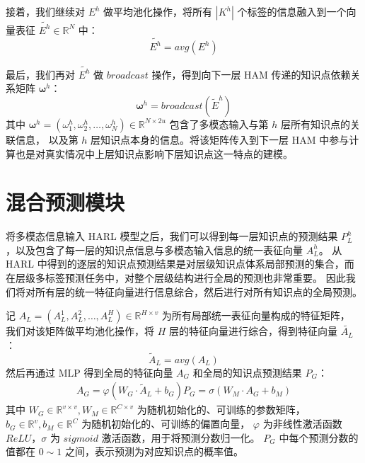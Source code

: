     接着，我们继续对 $E^h$ 做平均池化操作，将所有 $\left|K^h\right|$ 个标签的信息融入到一个向量表征 $\tilde{E^h} \in \mathbb{R}^{N}$ 中：
    \begin{equation}
        \tilde{E^h} = avg(E^h)
    \end{equation}

    最后，我们再对 $\tilde{E^h}$ 做 $broadcast$ 操作，得到向下一层 HAM 传递的知识点依赖关系矩阵 $\boldsymbol{\omega}^h$：
    \begin{equation}
        \boldsymbol{\omega}^h = broadcast(\tilde{E}^h)
    \end{equation}
    其中 $\boldsymbol{\omega}^h = (\omega_1^h, \omega_2^h, \dots, \omega_N^h) \in \mathbb{R}^{N \times 2u}$ 包含了多模态输入与第 $h$ 层所有知识点的关联信息，
    以及第 $h$ 层知识点本身的信息。将该矩阵传入到下一层 HAM 中参与计算也是对真实情况中上层知识点影响下层知识点这一特点的建模。


\section{混合预测模块}
    将多模态信息输入 HARL 模型之后，我们可以得到每一层知识点的预测结果 $P_L^h$，以及包含了每一层的知识点信息与多模态输入信息的统一表征向量 $A_L^h$。
    从 HARL 中得到的逐层的知识点预测结果是对层级知识点体系局部预测的集合，而在层级多标签预测任务中，对整个层级结构进行全局的预测也非常重要。
    因此我们将对所有层的统一特征向量进行信息综合，然后进行对所有知识点的全局预测。

    记 $A_L = (A_L^1, A_L^2, \dots, A_L^H) \in \mathbb{R}^{H \times v}$ 为所有局部统一表征向量构成的特征矩阵，
    我们对该矩阵做平均池化操作，将 $H$ 层的特征向量进行综合，得到特征向量 $\tilde{A_L}$：
    \begin{equation}
        \tilde{A}_L = avg(A_L)
    \end{equation}
    然后再通过 MLP 得到全局的特征向量 $A_G$ 和全局的知识点预测结果 $P_G$：
    \begin{equation}
        \begin{aligned}
            A_G = \varphi\left(W_G \cdot \tilde{A}_L + b_G\right)
            P_G = \sigma\left(W_M \cdot A_G + b_M\right)
        \end{aligned}
    \end{equation}
    其中 $W_G \in \mathbb{R}^{v \times v}, W_M \in \mathbb{R}^{C \times v}$ 为随机初始化的、可训练的参数矩阵，
    $b_G \in \mathbb{R}^{v}, b_M \in \mathbb{R}^{C}$ 为随机初始化的、可训练的偏置向量，
    $\varphi$ 为非线性激活函数 $ReLU$，$\sigma$ 为 $sigmoid$ 激活函数，用于将预测分数归一化。
    $P_G$ 中每个预测分数的值都在 $0 \sim 1$ 之间，表示预测为对应知识点的概率值。

